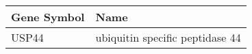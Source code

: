 \begin{tabular}{ll}
\toprule
Gene Symbol &                            Name \\
\midrule
      USP44 & ubiquitin specific peptidase 44 \\
\bottomrule
\end{tabular}
